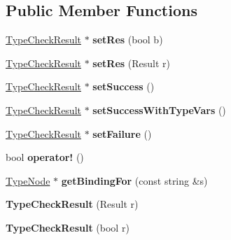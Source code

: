 \subsection*{Public Member Functions}
\begin{DoxyCompactItemize}
\item 
\mbox{\label{structTypeCheckResult_a0e555444a132e5a79ec8535bc7192893}} 
\hyperlink{structTypeCheckResult}{Type\+Check\+Result} $\ast$ {\bfseries set\+Res} (bool b)
\item 
\mbox{\label{structTypeCheckResult_a447e6b6d1071b6eac981587db960e162}} 
\hyperlink{structTypeCheckResult}{Type\+Check\+Result} $\ast$ {\bfseries set\+Res} (Result r)
\item 
\mbox{\label{structTypeCheckResult_a5d4e3cb1e9dbdb57ca07af42ab8e2b65}} 
\hyperlink{structTypeCheckResult}{Type\+Check\+Result} $\ast$ {\bfseries set\+Success} ()
\item 
\mbox{\label{structTypeCheckResult_ab66cd36034f7bf24156fc65729850de1}} 
\hyperlink{structTypeCheckResult}{Type\+Check\+Result} $\ast$ {\bfseries set\+Success\+With\+Type\+Vars} ()
\item 
\mbox{\label{structTypeCheckResult_a9ec37d368ac79f1d0da032f8d39911ae}} 
\hyperlink{structTypeCheckResult}{Type\+Check\+Result} $\ast$ {\bfseries set\+Failure} ()
\item 
\mbox{\label{structTypeCheckResult_acc9788ce17024aa37674a8080bc08231}} 
bool {\bfseries operator!} ()
\item 
\mbox{\label{structTypeCheckResult_a125ba7fbba05f80d14954eea886abd21}} 
\hyperlink{structTypeNode}{Type\+Node} $\ast$ {\bfseries get\+Binding\+For} (const string \&s)
\item 
\mbox{\label{structTypeCheckResult_a471209ffb1e1fb3584c5883411632f1d}} 
{\bfseries Type\+Check\+Result} (Result r)
\item 
\mbox{\label{structTypeCheckResult_a0b0a0bd72383ab9e6a20c1e4c9709919}} 
{\bfseries Type\+Check\+Result} (bool r)
\end{DoxyCompactItemize}
